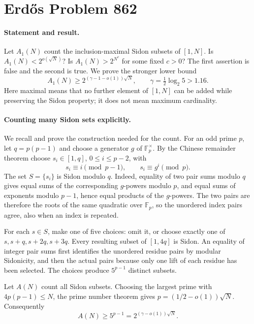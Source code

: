\section*{Erd\H{o}s Problem 862}

\paragraph{Statement and result.}
Let \(A_1(N)\) count the inclusion-maximal Sidon subsets of \([1,N]\). Is \(A_1(N)<2^{o(\sqrt N)}\)? Is \(A_1(N)>2^{N^c}\) for some fixed \(c>0\)? The first assertion is false and the second is true. We prove the stronger lower bound
\[
 A_1(N)\geq2^{(\gamma-1-o(1))\sqrt N},
 \qquad \gamma=\tfrac12\log_2 5>1.16.
\tag{1}
\]
Here maximal means that no further element of \([1,N]\) can be added while preserving the Sidon property; it does not mean maximum cardinality.

\paragraph{Counting many Sidon sets explicitly.}
We recall and prove the construction needed for the count. For an odd prime \(p\), let \(q=p(p-1)\) and choose a generator \(g\) of \(\mathbb F_p^\times\). By the Chinese remainder theorem choose \(s_i\in[1,q]\), \(0\leq i\leq p-2\), with
\[
 s_i\equiv i\pmod{p-1},\qquad s_i\equiv g^i\pmod p.
\]
The set \(S=\{s_i\}\) is Sidon modulo \(q\). Indeed, equality of two pair sums modulo \(q\) gives equal sums of the corresponding \(g\)-powers modulo \(p\), and equal sums of exponents modulo \(p-1\), hence equal products of the \(g\)-powers. The two pairs are therefore the roots of the same quadratic over \(\mathbb F_p\), so the unordered index pairs agree, also when an index is repeated.

For each \(s\in S\), make one of five choices: omit it, or choose exactly one of \(s,s+q,s+2q,s+3q\). Every resulting subset of \([1,4q]\) is Sidon. An equality of integer pair sums first identifies the unordered residue pairs by modular Sidonicity, and then the actual pairs because only one lift of each residue has been selected. The choices produce \(5^{p-1}\) distinct subsets.

Let \(A(N)\) count all Sidon subsets. Choosing the largest prime with \(4p(p-1)\leq N\), the prime number theorem gives \(p=(1/2-o(1))\sqrt N\). Consequently
\[
 A(N)\geq5^{p-1}=2^{(\gamma-o(1))\sqrt N}.
\tag{2}
\]

